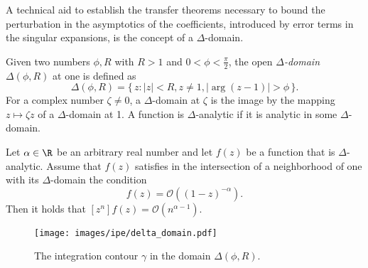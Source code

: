 A technical aid to establish the transfer theorems necessary to bound the perturbation in the asymptotics of the coefficients, introduced by error terms in the singular expansions, is the concept of a $\Delta$-domain.

\begin{definition}
  Given two numbers $\phi, R$ with $R > 1$ and $0 < \phi < \frac{\pi}{2}$, the open \textit{$\Delta$-domain} $\Delta(\phi,R)$ at one is defined as 
  $$
  \Delta(\phi,R) = \{\, z : |z| < R, z \neq 1, |\arg(z - 1)| > \phi \,\}.
  $$
  For a complex number $\zeta \neq 0$, a $\Delta$-domain at $\zeta$ is the image by the mapping $z \mapsto \zeta z$ of a $\Delta$-domain at 1. A function is $\Delta$-analytic if it is analytic in some $\Delta$-domain.
\end{definition}

\begin{theorem} 
\label{thm:transfer}
  Let $\alpha \in \R$ be an arbitrary real number and let $f(z)$ be a function that is $\Delta$-analytic. 
  Assume that $f(z)$ satisfies in the intersection of a neighborhood of one with its $\Delta$-domain the condition   
  $$
    f(z) = \mathcal{O}\left((1-z)^{-\alpha}\right).
  $$
  Then it holds that $[z^n]f(z) = \mathcal{O}(n^{\alpha-1}).$
\end{theorem}

\begin{figure}[hbt!]
  \centering
  \texttt{[image: images/ipe/delta\_domain.pdf]}
  \caption{The integration contour $\gamma$ in the domain $\Delta(\phi,R)$.}
  \label{fig:integration_contour_transfer_theorem}
\end{figure}

